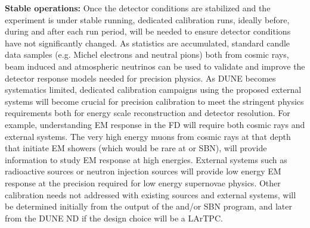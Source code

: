 \textbf{Stable operations:} Once the detector conditions are stabilized and the experiment is under stable running, dedicated calibration runs, ideally before, during and after each run period, will be needed to ensure detector conditions have not significantly changed. As statistics are accumulated, standard candle data samples (e.g. Michel electrons and neutral pions) both from cosmic rays, beam induced and atmospheric neutrinos can be used to validate and improve the detector response models needed for precision physics.  As DUNE becomes systematics limited, dedicated calibration campaigns using the proposed external systems will become crucial for precision calibration to meet the stringent physics requirements both for energy scale reconstruction and detector resolution. For example, understanding EM response in the FD will require both cosmic rays and external systems. The very high energy muons from cosmic rays at that depth that initiate EM showers (which would be rare at  or SBN), will provide information to study EM response at high energies. External systems such as radioactive sources or neutron injection sources will provide low energy EM response at the precision required for low energy supernovae physics. Other calibration needs not addressed with existing sources and external systems, will be determined initially from the output of the  and\slash or SBN program, and later from the DUNE ND if the design choice will be a LArTPC. 



